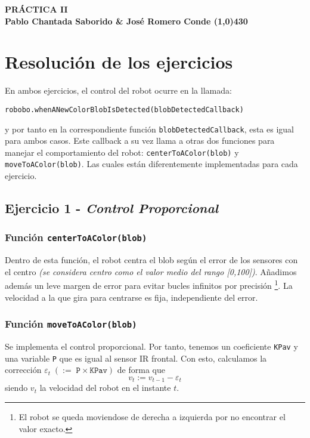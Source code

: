 \documentclass{article}
\begin{document}
\begin{center}
    \LARGE\bfseries PRÁCTICA II\\
    \small Pablo Chantada Saborido \& José Romero Conde
    \line(1,0){430}
\end{center}


\section*{Resolución de los ejercicios}
En ambos ejercicios, el control del robot ocurre en la llamada:

\par{\begin{center}\texttt{robobo.whenANewColorBlobIsDetected(blobDetectedCallback)}\end{center}}

\noindent y por tanto en la correspondiente función \texttt{blobDetectedCallback}, esta es igual para ambos casos. Este callback a su vez llama a otras dos funciones para manejar el comportamiento del robot: \texttt{centerToAColor(blob)} y \texttt{moveToAColor(blob)}. Las cuales están diferentemente implementadas para cada ejercicio.

\subsection*{Ejercicio 1 - \emph{Control Proporcional}}
\subsubsection*{Función \texttt{centerToAColor(blob)}}
Dentro de esta función, el robot centra el blob según el error de los sensores con el centro \textit{(se considera centro como el valor medio del rango [0,100])}. Añadimos además un leve margen de error para evitar bucles infinitos por precisión \footnote{El robot se queda moviendose de derecha a izquierda por no encontrar el valor exacto.}. La velocidad a la que gira para centrarse es fija, independiente del error. 

\subsubsection*{Función \texttt{moveToAColor(blob)}}
Se implementa el control proporcional. Por tanto, tenemos un coeficiente \texttt{KPav}
y una variable \texttt{P} que es igual al sensor IR frontal. Con esto, calculamos la corrección $\varepsilon_t \; (:= \; \texttt{P} \times \texttt{KPav} )$  de forma que \[ v_t := v_{t-1} - \varepsilon_t \] siendo $v_t$ la velocidad del robot en el instante $t$.
\end{document}
